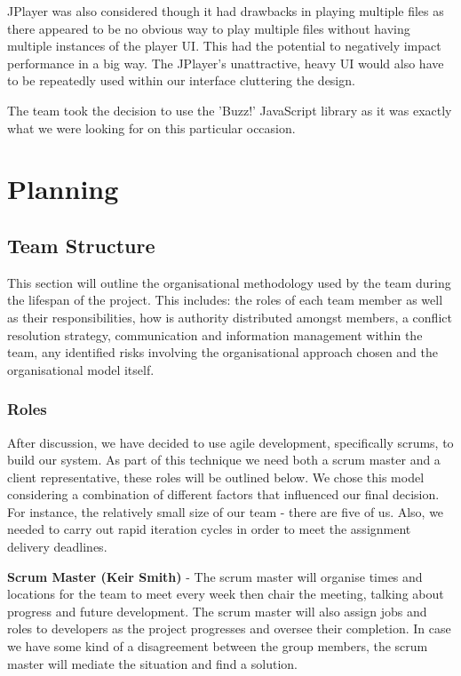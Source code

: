 \documentclass{l3proj}
\begin{document}
JPlayer was also considered though it had drawbacks in playing multiple files as there appeared to be no obvious way to play multiple files without having multiple instances of the player UI. This had the potential to negatively impact performance in a big way. The JPlayer's unattractive, heavy UI would also have to be repeatedly used within our interface cluttering the design.

The team took the decision to use the 'Buzz!' JavaScript library as it was exactly what we were looking for on this particular occasion.

\chapter{Planning}
\label{Planning}

\section{Team Structure}This section will outline the organisational methodology used by the team during the lifespan of the project. This includes: the roles of each team member as well as their responsibilities, how is authority distributed amongst members, a conflict resolution strategy, communication and information management within the team, any identified risks involving the organisational approach chosen and the organisational model itself.

\subsection{Roles}After discussion, we have decided to use agile development, specifically scrums, to build our system. As part of this technique we need both a scrum master and a client representative, these roles will be outlined below. We chose this model considering a combination of different factors that influenced our final decision. For instance, the relatively small size of our team - there are five of us. Also, we needed to carry out rapid iteration cycles in order to meet the assignment delivery deadlines.

{\bf Scrum Master (Keir Smith)} - The scrum master will organise times and locations for the team to meet every week then chair the meeting, talking about progress and future development. The scrum master will also assign jobs and roles to developers as the project progresses and oversee their completion. In case we have some kind of a disagreement between the group members, the scrum master will mediate the situation and find a solution.
\end{document}
